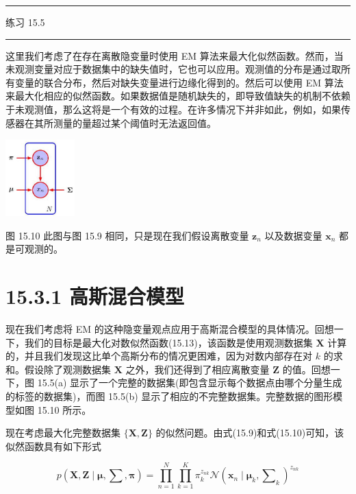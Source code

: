 \documentclass[10pt]{article}
\newcommand{\HRule}{\begin{center}\rule{0.9\linewidth}{0.2mm}\end{center}}
\begin{document}
\HRule

练习 15.5

\HRule

这里我们考虑了在存在离散隐变量时使用 EM 算法来最大化似然函数。然而，当未观测变量对应于数据集中的缺失值时，它也可以应用。观测值的分布是通过取所有变量的联合分布，然后对缺失变量进行边缘化得到的。然后可以使用 EM 算法来最大化相应的似然函数。如果数据值是随机缺失的，即导致值缺失的机制不依赖于未观测值，那么这将是一个有效的过程。在许多情况下并非如此，例如，如果传感器在其所测量的量超过某个阈值时无法返回值。

\begin{center}
\includegraphics[max width=0.2\textwidth]{images/0194e279-9b28-703a-88f4-c3ac21e2010d_497_1219_344_281_312_0.jpg}
\end{center}
\hspace*{3em} 

图 15.10 此图与图 15.9 相同，只是现在我们假设离散变量 \({\mathbf{z}}_{n}\) 以及数据变量 \({\mathbf{x}}_{n}\) 都是可观测的。

\section*{15.3.1 高斯混合模型}

现在我们考虑将 EM 的这种隐变量观点应用于高斯混合模型的具体情况。回想一下，我们的目标是最大化对数似然函数(15.13)，该函数是使用观测数据集 \(\mathbf{X}\) 计算的，并且我们发现这比单个高斯分布的情况更困难，因为对数内部存在对 \(k\) 的求和。假设除了观测数据集 \(\mathbf{X}\) 之外，我们还得到了相应离散变量 \(\mathbf{Z}\) 的值。回想一下，图 15.5(a) 显示了一个完整的数据集(即包含显示每个数据点由哪个分量生成的标签的数据集)，而图 15.5(b) 显示了相应的不完整数据集。完整数据的图形模型如图 15.10 所示。

现在考虑最大化完整数据集 \(\{ \mathbf{X},\mathbf{Z}\}\) 的似然问题。由式(15.9)和式(15.10)可知，该似然函数具有如下形式

\[
p\left( {\mathbf{X},\mathbf{Z} \mid  \mathbf{\mu },\mathbf{\sum },\mathbf{\pi }}\right)  = \mathop{\prod }\limits_{{n = 1}}^{N}\mathop{\prod }\limits_{{k = 1}}^{K}{\pi }_{k}^{{z}_{nk}}\mathcal{N}{\left( {\mathbf{x}}_{n} \mid  {\mathbf{\mu }}_{k},{\mathbf{\sum }}_{k}\right) }^{{z}_{nk}} \tag{15.25}
\]
\end{document}
